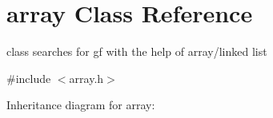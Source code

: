 \hypertarget{classarray}{}\section{array Class Reference}
\label{classarray}


class searches for gf with the help of array/linked list  




{\ttfamily \#include $<$array.\+h$>$}



Inheritance diagram for array\+:

